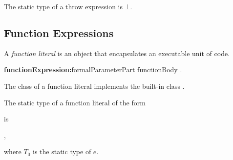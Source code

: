\documentclass{article}
\begin{document}

\LMHash{}
The static type of a throw expression is $\bot$.


\subsection{Function Expressions}

\LMHash{}
A {\em function literal} is an object that encapsulates an executable unit of code.

\begin{grammar}
{\bf functionExpression:}formalParameterPart functionBody
  .
\end{grammar}


\LMHash{}
The class of a function literal implements the built-in class \FUNCTION{}.

\LMHash{}
The static type of a function literal of the form



\noindent
is

,

\noindent
where $T_0$ is the static type of $e$.
\end{document}
